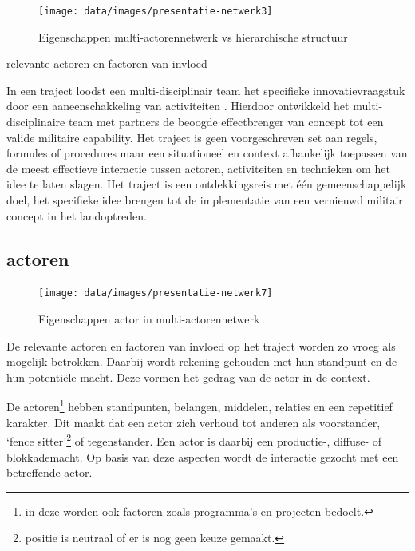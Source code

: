 \documentclass[
]{book}
\begin{document}
\begin{figure}

{\centering \texttt{[image: data/images/presentatie-netwerk3]} 

}

\caption{Eigenschappen multi-actorennetwerk vs hierarchische structuur}\label{fig:keten}
\end{figure}

relevante actoren en factoren van invloed

In een traject loodst een multi-disciplinair team het specifieke innovatievraagstuk door een aaneenschakkeling van activiteiten . Hierdoor ontwikkeld het multi-disciplinaire team met partners de beoogde effectbrenger van concept tot een valide militaire capability.
Het traject is geen voorgeschreven set aan regels, formules of procedures maar een situationeel en context afhankelijk toepassen van de meest effectieve interactie tussen actoren, activiteiten en technieken om het idee te laten slagen. Het traject is een ontdekkingsreis met één gemeenschappelijk doel, het specifieke idee brengen tot de implementatie van een vernieuwd militair concept in het landoptreden.

\hypertarget{actoren-1}{%
\subsection{actoren}\label{actoren-1}}

\begin{figure}

{\centering \texttt{[image: data/images/presentatie-netwerk7]} 

}

\caption{Eigenschappen actor in multi-actorennetwerk}\label{fig:actoren}
\end{figure}

De relevante actoren en factoren van invloed op het traject worden zo vroeg als mogelijk betrokken. Daarbij wordt rekening gehouden met hun standpunt en de hun potentiële macht. Deze vormen het gedrag van de actor in de context.

De actoren\footnote{in deze worden ook factoren zoals programma's en projecten bedoelt.} hebben standpunten, belangen, middelen, relaties en een repetitief karakter. Dit maakt dat een actor zich verhoud tot anderen als voorstander, `fence sitter'\footnote{positie is neutraal of er is nog geen keuze gemaakt.} of tegenstander. Een actor is daarbij een productie-, diffuse- of blokkademacht. Op basis van deze aspecten wordt de interactie gezocht met een betreffende actor.
\end{document}
